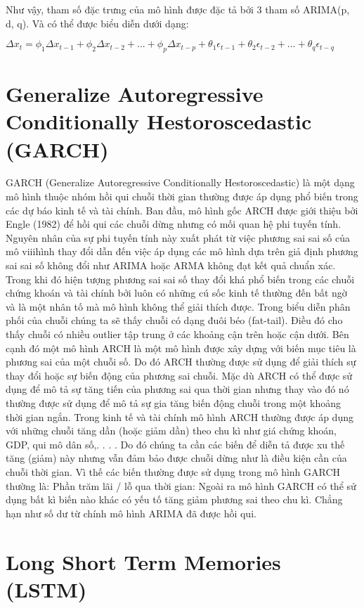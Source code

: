  Như vậy, tham số đặc trưng của mô hình được đặc tả bởi 3 tham số ARIMA(p, d, q). Và có thể được biểu diễn dưới dạng:
\begin{center}
	$ \Delta x_t = \phi_1 \Delta x_{t-1} +  \phi_2 \Delta x_{t-2} + ... +  \phi_p \Delta x_{t-p} + \theta_{1} \epsilon_{t-1} + \theta_{2} \epsilon_{t-2} + ... + \theta_{q} \epsilon_{t-q}
	$
\end{center}

\section{Generalize Autoregressive Conditionally Hestoroscedastic \\ (GARCH)}

GARCH (Generalize Autoregressive Conditionally Hestoroscedastic) là một dạng
mô hình thuộc nhóm hồi qui chuỗi thời gian thường được áp dụng phổ biến trong
các dự báo kinh tế và tài chính. Ban đầu, mô hình gốc ARCH được giới thiệu
bởi Engle (1982) để hồi qui các chuỗi dừng nhưng có mối quan hệ phi tuyến tính.
Nguyên nhân của sự phi tuyến tính này xuất phát từ việc phương sai sai số của mô
viiihình thay đổi dẫn đến việc áp dụng các mô hình dựa trên giả định phương sai sai
số không đổi như ARIMA hoặc ARMA không đạt kết quả chuẩn xác. Trong khi đó
hiện tượng phương sai sai số thay đổi khá phổ biến trong các chuỗi chứng khoán và
tài chính bởi luôn có những cú sốc kinh tế thường đến bất ngờ và là một nhân tố
mà mô hình không thể giải thích được. Trong biểu diễn phân phối của chuỗi chúng
ta sẽ thấy chuỗi có dạng đuôi béo (fat-tail). Điều đó cho thấy chuỗi có nhiều outlier
tập trung ở các khoảng cận trên hoặc cận dưới.
Bên cạnh đó một mô hình ARCH là một mô hình được xây dựng với biến
mục tiêu là phương sai của một chuỗi số. Do đó ARCH thường được sử dụng để
giải thích sự thay đổi hoặc sự biến động của phương sai chuỗi. Mặc dù ARCH có
thể được sử dụng để mô tả sự tăng tiến của phương sai qua thời gian nhưng thay
vào đó nó thường được sử dụng để mô tả sự gia tăng biến động chuỗi trong một
khoảng thời gian ngắn.
Trong kinh tế và tài chính mô hình ARCH thường được áp dụng với những
chuỗi tăng dần (hoặc giảm dần) theo chu kì như giá chứng khoán, GDP, qui mô
dân số,. . . . Do đó chúng ta cần các biến để diễn tả được xu thế tăng (giảm) này
nhưng vẫn đảm bảo được chuỗi dừng như là điều kiện cần của chuỗi thời gian. Vì
thế các biến thường được sử dụng trong mô hình GARCH thường là:
Phần trăm lãi / lỗ qua thời gian: Ngoài ra mô hình GARCH có thể sử dụng
bất kì biến nào khác có yếu tố tăng giảm phương sai theo chu kì. Chẳng hạn như
số dư từ chính mô hình ARIMA đã được hồi qui.

\section{Long Short Term Memories (LSTM)}




